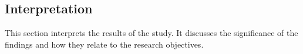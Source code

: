\subsection{Interpretation}

This section interprets the results of the study. It discusses the significance of the findings and how they relate to the research objectives.